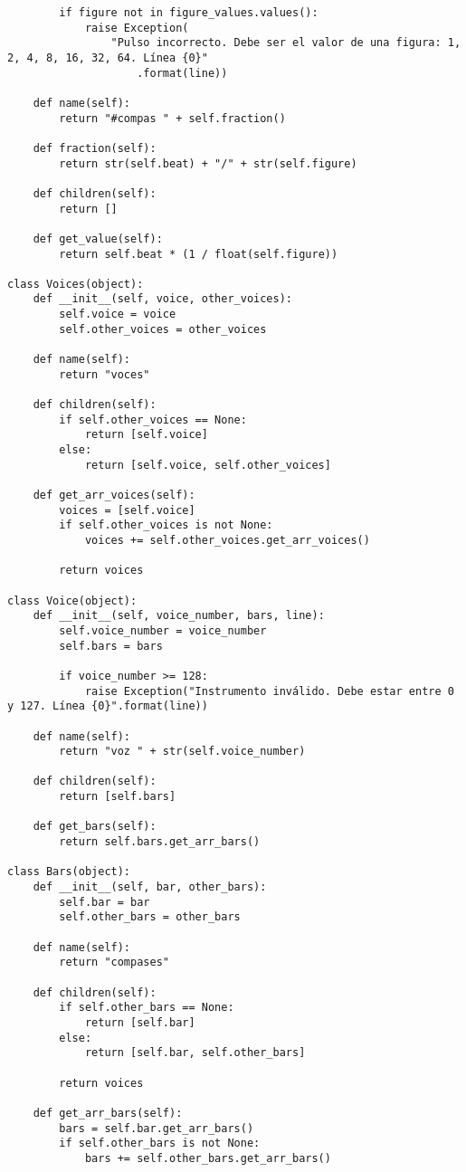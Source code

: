 \begin{verbatim}
        if figure not in figure_values.values():
            raise Exception(
                "Pulso incorrecto. Debe ser el valor de una figura: 1, 2, 4, 8, 16, 32, 64. Línea {0}"
                    .format(line))

    def name(self):
        return "#compas " + self.fraction()

    def fraction(self):
        return str(self.beat) + "/" + str(self.figure)

    def children(self):
        return []

    def get_value(self):
        return self.beat * (1 / float(self.figure))

class Voices(object):
    def __init__(self, voice, other_voices):
        self.voice = voice
        self.other_voices = other_voices

    def name(self):
        return "voces"

    def children(self):
        if self.other_voices == None:
            return [self.voice]
        else:
            return [self.voice, self.other_voices]

    def get_arr_voices(self):
        voices = [self.voice]
        if self.other_voices is not None:
            voices += self.other_voices.get_arr_voices()

        return voices

class Voice(object):
    def __init__(self, voice_number, bars, line):
        self.voice_number = voice_number
        self.bars = bars

        if voice_number >= 128:
            raise Exception("Instrumento inválido. Debe estar entre 0 y 127. Línea {0}".format(line))

    def name(self):
        return "voz " + str(self.voice_number)

    def children(self):
        return [self.bars]

    def get_bars(self):
        return self.bars.get_arr_bars()

class Bars(object):
    def __init__(self, bar, other_bars):
        self.bar = bar
        self.other_bars = other_bars

    def name(self):
        return "compases"

    def children(self):
        if self.other_bars == None:
            return [self.bar]
        else:
            return [self.bar, self.other_bars]

        return voices

    def get_arr_bars(self):
        bars = self.bar.get_arr_bars()
        if self.other_bars is not None:
            bars += self.other_bars.get_arr_bars()


\end{verbatim}
